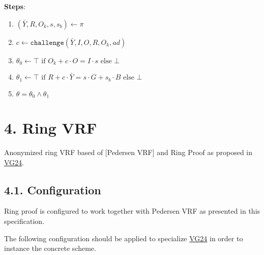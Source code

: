 \documentclass[
]{article}
\providecommand{\tightlist}{%
  \setlength{\itemsep}{0pt}\setlength{\parskip}{0pt}}
\begin{document}
\textbf{Steps}:

\begin{enumerate}
\def\labelenumi{\arabic{enumi}.}
\tightlist
\item
  \((\bar{Y}, R, O_k, s, s_b) \gets \pi\)
\item
  \(c \gets \texttt{challenge}(\bar{Y}, I, O, R, O_k, ad)\)
\item
  \(\theta_0 \gets \top \text{ if } O_k + c \cdot O = I \cdot s \text{ else } \bot\)
\item
  \(\theta_1 \gets \top \text{ if } R + c \cdot \bar{Y} = s \cdot G + s_b \cdot B \text{ else } \bot\)
\item
  \(\theta = \theta_0 \land \theta_1\)
\end{enumerate}

\hypertarget{ring-vrf}{%
\section{4. Ring VRF}\label{ring-vrf}}

Anonymized ring VRF based of {[}Pedersen VRF{]} and Ring Proof as
proposed in \href{https://github.com/davxy/ring-proof-spec}{VG24}.

\hypertarget{configuration-2}{%
\subsection{4.1. Configuration}\label{configuration-2}}

Ring proof is configured to work together with Pedersen VRF as presented
in this specification.

The following configuration should be applied to specialize
\href{https://github.com/davxy/ring-proof-spec}{VG24} in order to
instance the concrete scheme.
\end{document}
